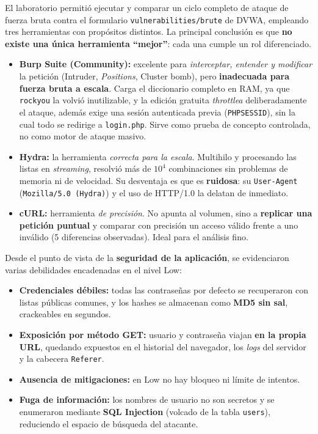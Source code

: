 \documentclass[letter,12pt]{article}
\begin{document}
El laboratorio permitió ejecutar y comparar un ciclo completo de ataque de fuerza bruta contra el formulario \texttt{vulnerabilities/brute} de DVWA, empleando tres herramientas con propósitos distintos. La principal conclusión es que \textbf{no existe una única herramienta ``mejor''}: cada una cumple un rol diferenciado.

\begin{itemize}
    \item \textbf{Burp Suite (Community):} excelente para \emph{interceptar, entender y modificar} la petición (Intruder, \emph{Positions}, Cluster bomb), pero \textbf{inadecuada para fuerza bruta a escala}. Carga el diccionario completo en RAM, ya que \texttt{rockyou} la volvió inutilizable, y la edición gratuita \emph{throttlea} deliberadamente el ataque, además exige una sesión autenticada previa (\texttt{PHPSESSID}), sin la cual todo se redirige a \texttt{login.php}. Sirve como prueba de concepto controlada, no como motor de ataque masivo.
    \item \textbf{Hydra:} la herramienta \emph{correcta para la escala}. Multihilo y procesando las listas en \emph{streaming}, resolvió más de $10^{4}$ combinaciones sin problemas de memoria ni de velocidad. Su desventaja es que es \textbf{ruidosa}: su \texttt{User-Agent} (\texttt{Mozilla/5.0 (Hydra)}) y el uso de HTTP/1.0 la delatan de inmediato.
    \item \textbf{cURL:} herramienta \emph{de precisión}. No apunta al volumen, sino a \textbf{replicar una petición puntual} y comparar con precisión un acceso válido frente a uno inválido (5 diferencias observadas). Ideal para el análisis fino.
\end{itemize}

Desde el punto de vista de la \textbf{seguridad de la aplicación}, se evidenciaron varias debilidades encadenadas en el nivel Low:
\begin{itemize}
    \item \textbf{Credenciales débiles:} todas las contraseñas por defecto se recuperaron con listas públicas comunes, y los hashes se almacenan como \textbf{MD5 sin sal}, crackeables en segundos.
    \item \textbf{Exposición por método GET:} usuario y contraseña viajan \textbf{en la propia URL}, quedando expuestos en el historial del navegador, los \emph{logs} del servidor y la cabecera \texttt{Referer}.
    \item \textbf{Ausencia de mitigaciones:} en Low no hay bloqueo ni límite de intentos.
    
    \item \textbf{Fuga de información:} los nombres de usuario no son secretos y se enumeraron mediante \textbf{SQL Injection} (volcado de la tabla \texttt{users}), reduciendo el espacio de búsqueda del atacante.
\end{itemize}
\end{document}
